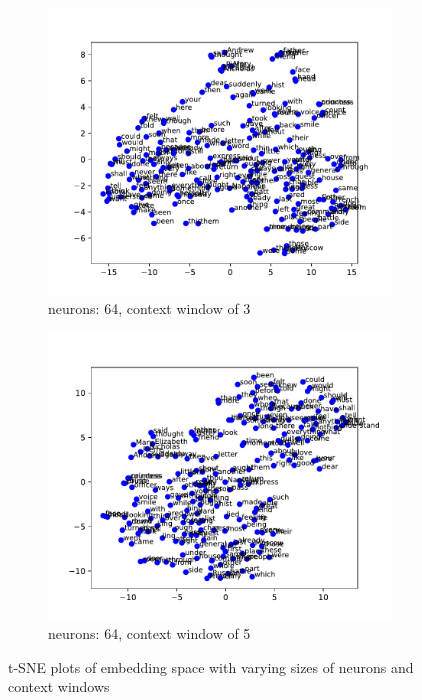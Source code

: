 \documentclass[12pt]{article} \usepackage{COSC420style} \usepackage{soul}
\begin{document}
\begin{figure}[htbp]
\begin{subfigure}[b]{0.45\textwidth}
	\end{subfigure}
	\newline %
	\begin{subfigure}[b]{0.45\textwidth}
		\includegraphics[width=\textwidth]{./figures/dim_64_ctx_3_embedding.pdf}
		\caption{neurons: 64, context window of 3}
		\label{fig:64_3}
	\end{subfigure}
	\begin{subfigure}[b]{0.45\textwidth}
		\includegraphics[width=\textwidth]{./figures/dim_64_ctx_5_embedding.pdf}
		\caption{neurons: 64, context window of 5}
		\label{fig:64_5}
	\end{subfigure}
	\caption{t-SNE plots of embedding space with varying sizes of neurons and context
		windows}
	\label{fig:small_embeddings}
\end{figure}
\end{document}
